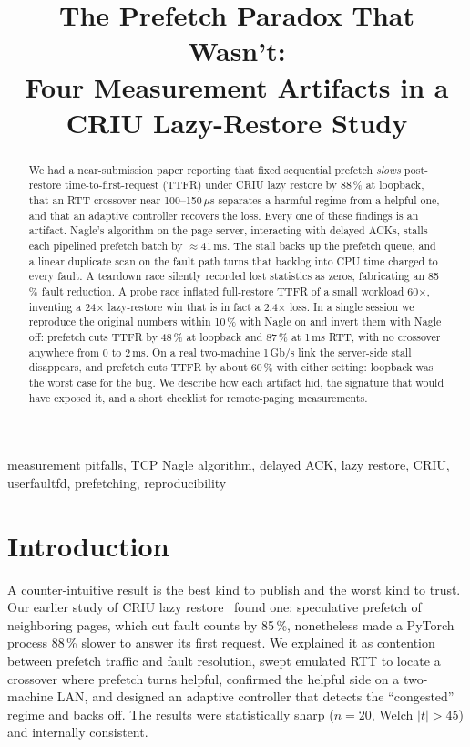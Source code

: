 \documentclass[conference]{IEEEtran}
\title{The Prefetch Paradox That Wasn't:\\
Four Measurement Artifacts in a CRIU Lazy-Restore Study}
\author{\IEEEauthorblockN{Utkarsh Maurya}
\IEEEauthorblockA{Independent Researcher\\
\href{mailto:utkarsh@kernex.sbs}{utkarsh@kernex.sbs}}}
\newcommand{\us}{\,$\mu$s\xspace}
\begin{document}
\maketitle

\begin{abstract}
We had a near-submission paper reporting that fixed sequential prefetch
\emph{slows} post-restore time-to-first-request (TTFR) under CRIU lazy restore
by 88\,\% at loopback, that an RTT crossover near 100--150\us separates a
harmful regime from a helpful one, and that an adaptive controller recovers the
loss. Every one of these findings is an artifact. Nagle's algorithm on the page
server, interacting with delayed ACKs, stalls each pipelined prefetch batch by
${\approx}41$\,ms. The stall backs up the prefetch queue, and a linear
duplicate scan on the fault path turns that backlog into CPU time charged to
every fault. A teardown race silently recorded lost statistics as zeros,
fabricating an 85\,\% fault reduction. A probe race inflated full-restore TTFR
of a small workload 60$\times$, inventing a 24$\times$ lazy-restore win that is
in fact a 2.4$\times$ loss. In a single session we reproduce the original
numbers within 10\,\% with Nagle on and invert them with Nagle off: prefetch
cuts TTFR by 48\,\% at loopback and 87\,\% at 1\,ms RTT, with no crossover
anywhere from 0 to 2\,ms. On a real two-machine 1\,Gb/s link the server-side
stall disappears, and prefetch cuts TTFR by about 60\,\% with either setting:
loopback was the worst case for the bug. We describe how each artifact hid, the signature
that would have exposed it, and a short checklist for remote-paging
measurements.
\end{abstract}

\begin{IEEEkeywords}
measurement pitfalls, TCP Nagle algorithm, delayed ACK, lazy restore, CRIU,
userfaultfd, prefetching, reproducibility
\end{IEEEkeywords}

\section{Introduction}

A counter-intuitive result is the best kind to publish and the worst kind to
trust. Our earlier study of CRIU lazy restore~\cite{criu,criu-lazy} found
one: speculative prefetch of neighboring pages, which cut fault counts by
85\,\%, nonetheless made a PyTorch process 88\,\% slower to answer its first
request. We explained it as contention between prefetch traffic and fault
resolution, swept emulated RTT to locate a crossover where prefetch turns
helpful, confirmed the helpful side on a two-machine LAN, and designed an
adaptive controller that detects the ``congested'' regime and backs off. The
results were statistically sharp ($n\!=\!20$, Welch $|t|>45$) and internally
consistent.
\end{document}
